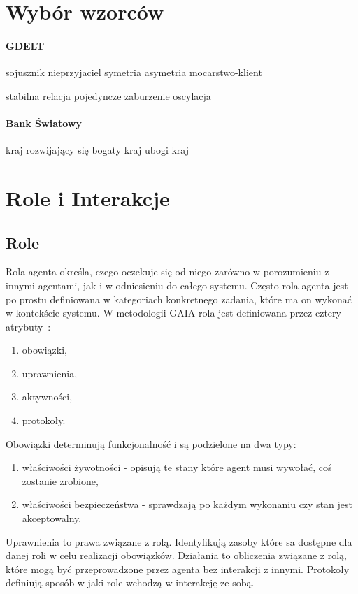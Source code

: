 \documentclass[11pt]{report}
\begin{document}
    \section{Wybór wzorców}\label{sec:wybór-wzorców}

    \paragraph{GDELT}

    sojusznik
    nieprzyjaciel
    symetria
    asymetria
    mocarstwo-klient

    stabilna relacja
    pojedyncze zaburzenie
    oscylacja

    \paragraph{Bank Światowy}

    kraj rozwijający się
    bogaty kraj
    ubogi kraj


    \section{Role i Interakcje}

    \subsection{Role}
    Rola agenta określa, czego oczekuje się od niego zarówno w porozumieniu z innymi agentami, jak i w odniesieniu do całego systemu.
    Często rola agenta jest po prostu definiowana w kategoriach konkretnego zadania, które ma on wykonać w kontekście systemu.
    W metodologii GAIA rola jest definiowana przez cztery atrybuty~\cite{Wooldridge2000a}:
    \begin{enumerate}
        \item obowiązki,
        \item uprawnienia,
        \item aktywności,
        \item protokoły.
    \end{enumerate}
    Obowiązki determinują funkcjonalność i są podzielone na dwa typy:
    \begin{enumerate}
        \item właściwości żywotności - opisują te stany które agent musi wywołać, coś zostanie zrobione,
        \item właściwości bezpieczeństwa - sprawdzają po każdym wykonaniu czy stan jest akceptowalny.
    \end{enumerate}
    Uprawnienia to prawa związane z rolą.
    Identyfikują zasoby które sa dostępne dla danej roli w celu realizacji obowiązków.
    Działania to obliczenia związane z rolą, które mogą być przeprowadzone przez agenta bez interakcji z innymi.
    Protokoły definiują sposób w jaki role wchodzą w interakcję ze sobą.
\end{document}
